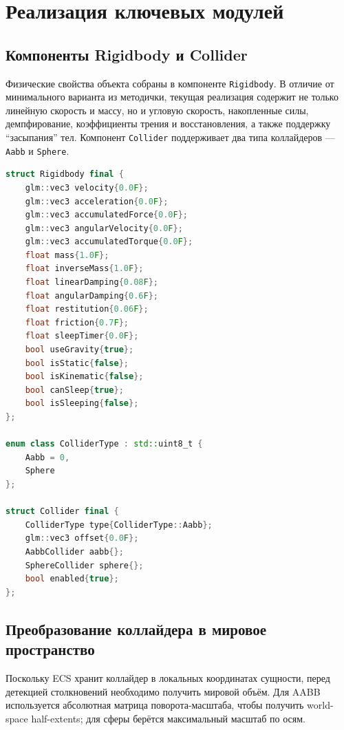 \documentclass[a4paper,14pt]{extarticle}
\DeclareRobustCommand{\code}[1]{\nolinkurl{#1}}
\begin{document}
\section{Реализация ключевых модулей}
\subsection{Компоненты Rigidbody и Collider}
Физические свойства объекта собраны в компоненте \texttt{Rigidbody}. В отличие от минимального варианта из методички, текущая реализация содержит не только линейную скорость и массу, но и угловую скорость, накопленные силы, демпфирование, коэффициенты трения и восстановления, а также поддержку ``засыпания'' тел. Компонент \texttt{Collider} поддерживает два типа коллайдеров --- \texttt{Aabb} и \texttt{Sphere}.

\begin{lstlisting}[language=C++,caption={Компоненты \code{Rigidbody} и \code{Collider}}]
struct Rigidbody final {
    glm::vec3 velocity{0.0F};
    glm::vec3 acceleration{0.0F};
    glm::vec3 accumulatedForce{0.0F};
    glm::vec3 angularVelocity{0.0F};
    glm::vec3 accumulatedTorque{0.0F};
    float mass{1.0F};
    float inverseMass{1.0F};
    float linearDamping{0.08F};
    float angularDamping{0.6F};
    float restitution{0.06F};
    float friction{0.7F};
    float sleepTimer{0.0F};
    bool useGravity{true};
    bool isStatic{false};
    bool isKinematic{false};
    bool canSleep{true};
    bool isSleeping{false};
};

enum class ColliderType : std::uint8_t {
    Aabb = 0,
    Sphere
};

struct Collider final {
    ColliderType type{ColliderType::Aabb};
    glm::vec3 offset{0.0F};
    AabbCollider aabb{};
    SphereCollider sphere{};
    bool enabled{true};
};
\end{lstlisting}

\subsection{Преобразование коллайдера в мировое пространство}
Поскольку ECS хранит коллайдер в локальных координатах сущности, перед детекцией столкновений необходимо получить мировой объём. Для AABB используется абсолютная матрица поворота-масштаба, чтобы получить world-space half-extents; для сферы берётся максимальный масштаб по осям.
\end{document}
